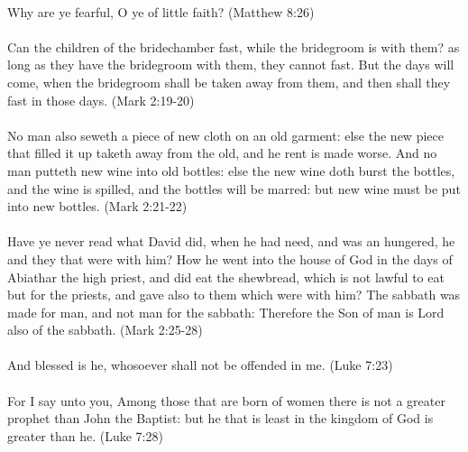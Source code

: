 \paragraph{} Why are ye fearful, O ye of little faith? (Matthew 8:26)  

\paragraph{} Can the children of the bridechamber fast, while the bridegroom is with them? as long as they have the bridegroom with them, they cannot fast. But the days will come, when the bridegroom shall be taken away from them, and then shall they fast in those days. (Mark 2:19-20)

\paragraph{} No man also seweth a piece of new cloth on an old garment: else the new piece that filled it up taketh away from the old, and he rent is made worse. And no man putteth new wine into old bottles: else the new wine doth burst the bottles, and the wine is spilled, and the bottles will be marred: but new wine must be put into new bottles. (Mark 2:21-22)

\paragraph{} Have ye never read what David did, when he had need, and was an hungered, he and they that were with him? How he went into the house of God in the days of Abiathar the high priest, and did eat the shewbread, which is not lawful to eat but for the priests, and gave also to them which were with him? The sabbath was made for man, and not man for the sabbath: Therefore the Son of man is Lord also of the sabbath. (Mark 2:25-28)

\paragraph{} And blessed is he, whosoever shall not be offended in me. (Luke 7:23)

\paragraph{} For I say unto you, Among those that are born of women there is not a greater prophet than John the Baptist: but he that is least in the kingdom of God is greater than he. (Luke 7:28)

